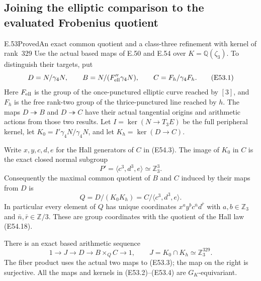 \subsection{Joining the elliptic comparison to the evaluated Frobenius quotient}

\begin{statement}{E.53}{Proved}{An exact common quotient and a class-three refinement with kernel of rank~329}
Use the actual based maps of E.50 and E.54 over
$K=\mathbb Q(\zeta_3)$. To distinguish their targets, put
\[
 D=N/\gamma_4N,\qquad
 B=N/(F_{\rm ell}''\gamma_4N),\qquad
 C=F_h/\gamma_4F_h .
 \tag{E53.1}
\]
Here $F_{\rm ell}$ is the group of the once-punctured elliptic
curve reached by $[3]$, and $F_h$ is the free rank-two group
of the thrice-punctured line reached by $h$.
The maps $D\twoheadrightarrow B$ and
$D\twoheadrightarrow C$ have their actual tangential
origins and arithmetic actions from those two results.
Let $I=\ker(N\to T_3E)$ be the full peripheral kernel,
let $K_0=I'\gamma_4N/\gamma_4N$, and let
$K_h=\ker(D\to C)$.

Write $x,y,c,d,e$ for the Hall generators of $C$ in
(E54.3). The image of $K_0$ in $C$ is the exact closed
normal subgroup
\[
        P'=\langle c^3,d^3,e\rangle
              \simeq\mathbb Z_3^3.
 \tag{E53.2}
\]
Consequently the maximal common quotient of $B$ and $C$
induced by their maps from $D$ is
\[
 Q=D/(K_0K_h)
      =C/\langle c^3,d^3,e\rangle .
 \tag{E53.3}
\]
In particular every element of $Q$ has unique coordinates
$x^a y^b c^{\bar n}d^{\bar r}$ with
$a,b\in\mathbb Z_3$ and $\bar n,\bar r\in\mathbb Z/3$.
These are group coordinates with the quotient of the
Hall law (E54.18).

There is an exact based arithmetic sequence
\[
 1\longrightarrow J
 \longrightarrow D
 \longrightarrow B\times_Q C
 \longrightarrow1,\qquad
       J=K_0\cap K_h\simeq\mathbb Z_3^{329}.
 \tag{E53.4}
\]
The fiber product uses the actual two maps to (E53.3);
the map on the right is surjective.
All the maps and kernels in (E53.2)--(E53.4) are
$G_K$-equivariant.


\end{statement}
